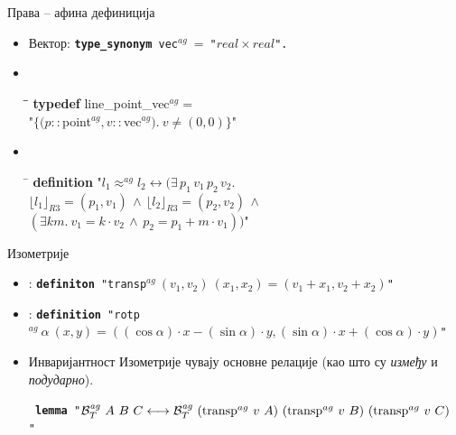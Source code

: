 \documentclass[slidestop, compress, mathserif, containsverbatim, xcolor=dvipsnames]{beamer}
\newcommand{\agbett}[3]{\ensuremath{\mathcal{B}_T^{\mathit{ag}}\ #1\ #2\ #3}}
\newcommand{\ag}[2]{\ensuremath{^{ag}\ #1\ #2}}
\newcommand{\RepRt}[1]{\ensuremath{\lfloor#1\rfloor_{R3}}}
\begin{document}
\begin{frame}{Права -- афина дефиниција}
  \begin{itemize}
    \item Вектор: {\tt {\bf type\_synonym}\ vec$^{ag}\ =\ $"$real   \times real$".} \vfill
    \item {\tt 
      \begin{tabbing}
          \hspace{5mm}\=\hspace{5mm}\=\kill
          {\bf typedef} line\_point\_vec$^{ag}=$\\
            \> "$\{(p::$point$^{ag}, v::$vec$^{ag}).\ v \neq (0, 0)\}$"
      \end{tabbing}
      } \vfill
    \item {\tt
      \begin{tabbing}
        \hspace{5mm}\=\kill
        {\bf definition} "$l_1 \approx^{ag} l_2 \longleftrightarrow (\exists\,p_1\,v_1\,p_2\,v_2.$\\
        \>$\RepRt{l_1} = (p_1, v_1) \,\wedge\,  \RepRt{l_2} = (p_2, v_2) \,\wedge$\\
        \>$(\exists k m.\ v_1 = k\cdot v_2 \,\wedge\, p_2 = p_1 + m\cdot v_1))$"
      \end{tabbing}
    }
  \end{itemize}
\end{frame}

\begin{frame}{Изометрије}
  \begin{itemize}
    \item {}: {\tt {\bf definiton} "transp$\ag{(v_1, v_2)}{(x_1, x_2)} = (v_1 + x_1, v_2 + x_2)$"\ }
    \item {}: {\tt {\bf definition} "rotp$\ag{\alpha}{(x, y)} = ((\cos \alpha)\cdot x - (\sin
\alpha)\cdot y , (\sin \alpha)\cdot x + (\cos \alpha)\cdot y)$"\ }
    \item \begin{block}{Инваријантност} 
      Изометрије чувају основне релације (као што су \emph{између} и \emph{подударно}).
      \end{block}
      {\tt
        {\bf lemma} "$\agbett{A}{B}{C} \longleftrightarrow \agbett{($transp$\ag{v}{A})}{($transp$\ag{v}{B})}{($transp$\ag{v}{C})}$"\
      }
  \end{itemize}
\end{frame}
\end{document}
